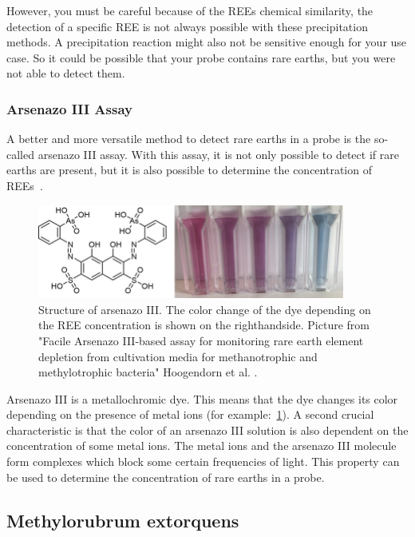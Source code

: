 However, you must be careful because of the REEs chemical similarity, the detection of a specific REE is not always possible with these precipitation methods.
A precipitation reaction might also not be sensitive enough for your use case.
So it could be possible that your probe contains rare earths, but you were not able to detect them.

\subsubsection{Arsenazo III Assay}
A better and more versatile method to detect rare earths in a probe is the so-called arsenazo III assay.
With this assay, it is not only possible to detect if rare earths are present, but it is also possible to determine the concentration of REEs~\cite{arsenazo3assay}.

\begin{figure}[H]
    \centering
    \includegraphics[width=0.9\textwidth]{media/images/arsenazo3_structure_example}
    \caption{Structure of arsenazo III. The color change of the dye depending on the REE concentration is shown on the righthandside. Picture from "Facile Arsenazo III-based assay for monitoring rare earth element depletion from cultivation media for methanotrophic and methylotrophic bacteria" Hoogendorn et al. \cite{arsenazo3assay}.}
    \label{fig:arsenazo3}
\end{figure}

Arsenazo III is a metallochromic dye.
This means that the dye changes its color depending on the presence of metal ions (for example:~\ref{fig:arsenazo3}).
A second crucial characteristic is that the color of an arsenazo III solution is also dependent on the concentration of some metal ions.
The metal ions and the arsenazo III molecule form complexes which block some certain frequencies of light.
This property can be used to determine the concentration of rare earths in a probe.

\newpage

\subsection{Methylorubrum extorquens}

